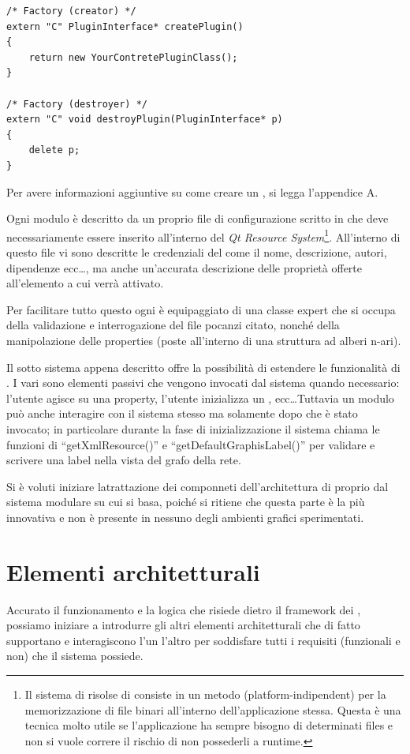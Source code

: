 \begin{lstlisting}
/* Factory (creator) */
extern "C" PluginInterface* createPlugin()
{
	return new YourContretePluginClass();
}

/* Factory (destroyer) */
extern "C" void destroyPlugin(PluginInterface* p)
{
	delete p;
}
\end{lstlisting}
Per avere informazioni aggiuntive su come creare un \plugin{}, si legga l'appendice A.

Ogni modulo è descritto da un proprio file di configurazione scritto in \xml{} che deve necessariamente essere inserito all'interno del \emph{Qt Resource System}\footnote{Il sistema di risolse di \qt{} consiste in un metodo (platform-indipendent) per la memorizzazione di file binari all'interno dell'applicazione stessa. Questa è una tecnica molto utile se l'applicazione ha sempre bisogno di determinati files e non si vuole correre il rischio di non possederli a runtime.}. All'interno di questo file vi sono descritte le credenziali del \plugin{} come il nome, descrizione, autori, dipendenze ecc\ldots, ma anche un'accurata descrizione delle proprietà offerte all'elemento a cui verrà attivato.

Per facilitare tutto questo ogni \proxy{} è equipaggiato di una classe expert che si occupa della validazione e interrogazione del file \xml{} pocanzi citato, nonché della manipolazione delle properties (poste all'interno di una struttura ad alberi n-ari).

Il sotto sistema appena descritto offre la possibilità di estendere le funzionalità di \visualnetkit{}. I vari \plugin{} sono elementi passivi che vengono invocati dal sistema quando necessario: l'utente agisce su una property, l'utente inizializza un \plugin{}, ecc\ldots Tuttavia un modulo può anche interagire con il sistema stesso ma solamente dopo che è stato invocato; in particolare durante la fase di inizializzazione il sistema chiama le funzioni di ``getXmlResource()'' e ``getDefaultGraphisLabel()'' per validare e scrivere una label nella vista del grafo della rete.

Si è voluti iniziare latrattazione dei componneti dell'architettura di \visualnetkit{} proprio dal sistema modulare su cui si basa, poiché si ritiene che questa parte è la più innovativa e non è presente in nessuno degli ambienti grafici sperimentati.

\section{Elementi architetturali}
Accurato il funzionamento e la logica che risiede dietro il framework dei \plugin{}, possiamo iniziare a introdurre gli altri elementi architetturali che di fatto supportano e interagiscono l'un l'altro per soddisfare tutti i requisiti (funzionali e non) che il sistema possiede.

